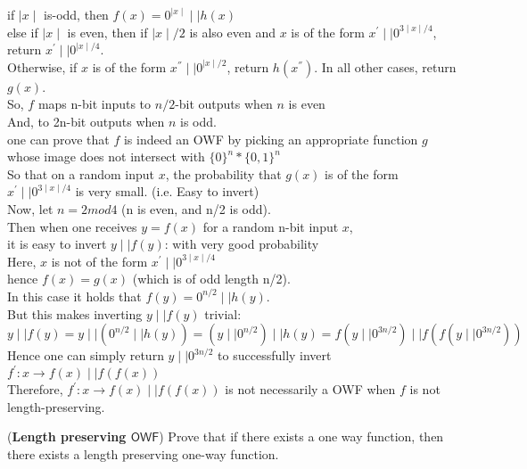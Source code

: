 \documentclass[11pt]{exam}
\newcommand{\owf}{\mathsf{OWF}}
\begin{document}
\begin{questions}
\begin{solution}
    if $\mid x\mid$ is-odd, then $f(x)=0^{\mid x\mid} \mid\mid h(x)$\\
    else if $\mid x \mid$ is even, then if $\mid x\mid/2$ is also even and $x$ is of the form $x^{'} \mid\mid 0^{3\mid x\mid/4}$, return $x^{'}\mid\mid 0^{\mid x\mid/4}$.\\
    Otherwise, if $x$ is of the form $x^{''}\mid\mid 0^{\mid x\mid/2}$, return $h(x^{''})$. In all other cases, return $g(x)$.\\
    So, $f$ maps n-bit inputs to $n/2$-bit outputs when $n$ is even\\
    And, to 2n-bit outputs when $n$ is odd.\\
    one can prove that $f$ is indeed an OWF by picking an appropriate function $g$ whose image does not intersect with $\{0\}^{n}*\{0,1\}^n$\\
    So that on a random input $x$, the probability that $g(x)$ is of the form $x^{'} \mid\mid 0^{3\mid x\mid/4}$ is very small. (i.e. Easy to invert)\\
    Now, let $n = 2 mod 4$ (n is even, and n/2 is odd).\\
    Then when one receives $y=f(x)$ for a random n-bit input $x$,\\
    it is easy to invert $y \mid\mid f(y)$: with very good probability\\
    Here, $x$ is not of the form $x^{'} \mid\mid 0^{3\mid x\mid/4}$ \\
    hence $f(x)=g(x)$ (which is of odd length n/2). \\
    In this case it holds that $f(y)=0^{n/2} \mid\mid h(y)$. \\
    But this makes inverting $y \mid \mid f(y)$ trivial:\\
    $y \mid \mid f(y) = y \mid \mid (0^{n/2} \mid\mid h(y)) = (y \mid \mid 0^{n/2}) \mid\mid h(y)= f(y\mid\mid 0^{3n/2})\mid\mid f(f(y\mid\mid 0^{3n/2})) $ \\
    Hence one can simply return $y\mid\mid 0^{3n/2}$ to successfully invert $f^{'}:x \rightarrow f(x)\mid\mid f(f(x))$\\
    Therefore, $f^{'}:x \rightarrow f(x)\mid\mid f(f(x))$ is not necessarily a OWF when $f$ is not length-preserving.
\end{solution}

\question[10]({\bf Length preserving $\owf$}) Prove that if there exists a one way function, then there exists a length preserving one-way function.


\end{questions}
\end{document}

